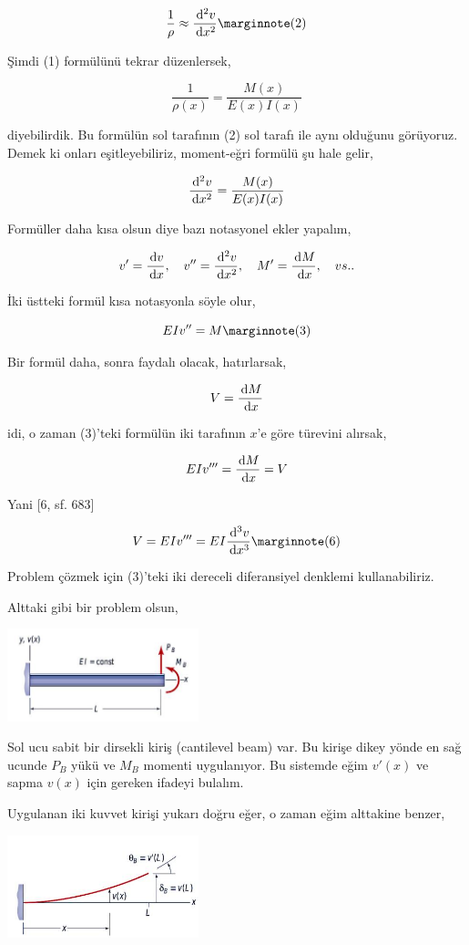 \documentclass[12pt,fleqn]{article}\usepackage{../../common}
\begin{document}
$$
\frac{1}{\rho} \approx \frac{\ud^2 v}{\ud x^2}
\mlabel{2}
$$

Şimdi (1) formülünü tekrar düzenlersek,

$$
\frac{1}{\rho(x)} = \frac{M(x)}{E(x) I(x)}
$$

diyebilirdik. Bu formülün sol tarafının (2) sol tarafı ile aynı olduğunu
görüyoruz. Demek ki onları eşitleyebiliriz, moment-eğri formülü şu hale gelir,

$$
\frac{\,\mathrm{d}^2 v}{\,\mathrm{d} x^2} = \frac{M(x)}{E(x) I(x)}
$$

Formüller daha kısa olsun diye bazı notasyonel ekler yapalım,

$$
v' = \frac{\,\mathrm{d} v}{\,\mathrm{d} x}, \quad 
v'' = \frac{\,\mathrm{d}^2 v}{\,\mathrm{d} x^2}, \quad 
M' = \frac{\,\mathrm{d} M}{\,\mathrm{d} x}, \quad vs..
$$

İki üstteki formül kısa notasyonla söyle olur,

$$
EI v'' = M
\mlabel{3}
$$

Bir formül daha, sonra faydalı olacak, hatırlarsak,

$$
V = \frac{\,\mathrm{d} M}{\,\mathrm{d} x}
$$

idi, o zaman (3)'teki formülün iki tarafının $x$'e göre türevini alırsak,

$$
EI v''' = \frac{\,\mathrm{d} M}{\,\mathrm{d} x} = V
$$

Yani [6, sf. 683]

$$
V = EI v''' = EI \frac{\ud^3 v}{\ud x^3}
\mlabel{6}
$$

Problem çözmek için (3)'teki iki dereceli diferansiyel denklemi kullanabiliriz.

Alttaki gibi bir problem olsun,

\includegraphics[width=15em]{phy_020_strs_05_03.jpg}

Sol ucu sabit bir dirsekli kiriş (cantilevel beam) var. Bu kirişe dikey yönde en
sağ ucunde $P_B$ yükü ve $M_B$ momenti uygulanıyor. Bu sistemde eğim $v'(x)$ ve
sapma $v(x)$ için gereken ifadeyi bulalım.

Uygulanan iki kuvvet kirişi yukarı doğru eğer, o zaman eğim alttakine benzer,

\includegraphics[width=15em]{phy_020_strs_05_04.jpg}
\end{document}
